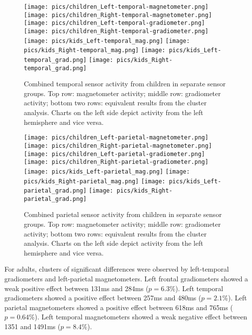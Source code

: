 \begin{figure}[h]
\begin{center}
\texttt{[image: pics/children\_Left-temporal-magnetometer.png]}
\texttt{[image: pics/children\_Right-temporal-magnetometer.png]}
\texttt{[image: pics/children\_Left-temporal-gradiometer.png]}
\texttt{[image: pics/children\_Right-temporal-gradiometer.png]}
\texttt{[image: pics/kids\_Left-temporal\_mag.png]}
\texttt{[image: pics/kids\_Right-temporal\_mag.png]}
\texttt{[image: pics/kids\_Left-temporal\_grad.png]}
\texttt{[image: pics/kids\_Right-temporal\_grad.png]}
\caption{\label{4.2.activity.kids.temporal} Combined temporal sensor activity from children in separate sensor groups. Top row: magnetometer activity; middle row: gradiometer activity; bottom two rows: equivalent results from the cluster analysis. Charts on the left side depict activity from the left hemisphere and vice versa.}
\end{center}
\end{figure}


\begin{figure}[h]
\begin{center}
\texttt{[image: pics/children\_Left-parietal-magnetometer.png]}
\texttt{[image: pics/children\_Right-parietal-magnetometer.png]}
\texttt{[image: pics/children\_Left-parietal-gradiometer.png]}
\texttt{[image: pics/children\_Right-parietal-gradiometer.png]}
\texttt{[image: pics/kids\_Left-parietal\_mag.png]}
\texttt{[image: pics/kids\_Right-parietal\_mag.png]}
\texttt{[image: pics/kids\_Left-parietal\_grad.png]}
\texttt{[image: pics/kids\_Right-parietal\_grad.png]}
\caption{\label{4.2.activity.kids.parietal} Combined parietal sensor activity from children in separate sensor groups. Top row: magnetometer activity; middle row: gradiometer activity; bottom two rows: equivalent results from the cluster analysis. Charts on the left side depict activity from the left hemisphere and vice versa.}
\end{center}
\end{figure}


For adults, clusters of significant differences were observed by left-temporal gradiometers and left-parietal magnetometers.
Left frontal gradiometers showed a weak positive effect between 131ms and 284ms ($p = 6.3\%$).
Left temporal gradiometers showed a positive effect between 257ms and 480ms ($p = 2.1\%$).
Left parietal magnetometers showed a positive effect between 618ms and 765ms ($p = 0.64\%$).
Left temporal magnetometers showed a weak negative effect between 1351 and 1491ms ($p = 8.4\%$).


